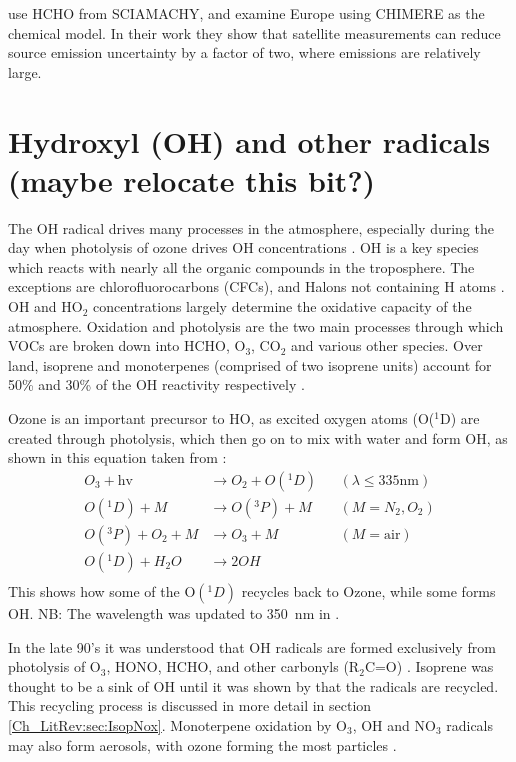 	    \citet{Dufour2009} use HCHO from SCIAMACHY, and examine Europe using CHIMERE as the chemical model. 
	    In their work they show that satellite measurements can reduce source emission uncertainty by a factor of two, where emissions are relatively large.  
  
  
\section{Hydroxyl (OH) and other radicals (maybe relocate this bit?)}
    The OH radical drives many processes in the atmosphere, especially during the day when photolysis of ozone drives OH concentrations \citep{Atkinson2000}.    
    OH is a key species which reacts with nearly all the organic compounds in the troposphere.
    The exceptions are chlorofluorocarbons (CFCs), and Halons not containing H atoms \citep{Atkinson2000}.
    OH and HO$_2$ concentrations largely determine the oxidative capacity of the atmosphere.
    Oxidation and photolysis are the two main processes through which VOCs are broken down into HCHO, O$_3$, CO$_2$ and various other species.
    Over land, isoprene and monoterpenes (comprised of two isoprene units) account for 50\% and 30\% of the OH reactivity respectively \citep{Fuentes2000}.
    
    Ozone is an important precursor to HO, as excited oxygen atoms (O(${}^1$D) are created through photolysis, which then go on to mix with water and form OH, as shown in this equation taken from \citet{Atkinson2000}:
    \begin{align*}
      O_3 + \text{hv}         & \to  O_2 + O({}^1D)   && (\lambda \le 335 \text{nm}) \\%
      O({}^1D) + M            & \to  O({}^3P) + M     && (M=N_2, O_2)               \\%
      O({}^3P) + O_2 + M      & \to  O_3 + M          && (M=\text{air})             \\%
      O({}^1D) + H_2O         & \to  2OH              &&                            \\%
    \end{align*}
    This shows how some of the O$({}^1D)$ recycles back to Ozone, while some forms OH.
    NB: The wavelength was updated to 350~nm in \citet{AtkinsonArey2003}.
    
    In the late 90's it was understood that OH radicals are formed exclusively from photolysis of O$_3$, HONO, HCHO, and other carbonyls (R$_2$C=O) \citet{Atkinson2000}.
    Isoprene was thought to be a sink of OH until it was shown by \cite{Paulot2009b} that the radicals are recycled.
    This recycling process is discussed in more detail in section \ref{Ch_LitRev:sec:IsopNox}.
    Monoterpene oxidation by O$_3$, OH and NO$_3$ radicals may also form aerosols, with ozone forming the most particles \citep{Kanakidou2005}.

